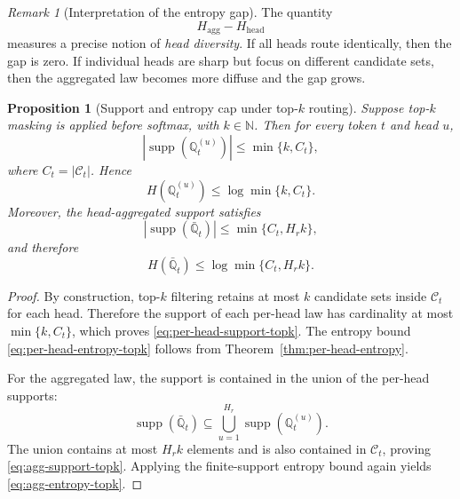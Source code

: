 \documentclass{article}
\theoremstyle{plain}
\newtheorem{proposition}[theorem]{Proposition}
\theoremstyle{definition}
\theoremstyle{remark}
\newtheorem{remark}[theorem]{Remark}
\begin{document}
\begin{remark}[Interpretation of the entropy gap]
\label{rem:entropy-gap-interpretation}
The quantity
\[
H_{\mathrm{agg}}-H_{\mathrm{head}}
\]
measures a precise notion of \emph{head diversity}. If all heads route identically, then the gap is zero. If individual heads are sharp but focus on different candidate sets, then the aggregated law becomes more diffuse and the gap grows.
\end{remark}

\begin{proposition}[Support and entropy cap under top-$k$ routing]
\label{prop:topk-support-entropy}
Suppose top-$k$ masking is applied before softmax, with $k\in \mathbb{N}$. Then for every token $t$ and head $u$,
\begin{equation}
\label{eq:per-head-support-topk}
\left| \operatorname{supp}\!\left(\mathbb{Q}^{(u)}_{t}\right)\right|
\le
\min\{k, C_{t}\},
\end{equation}
where $C_{t}=|\mathcal{C}_{t}|$. Hence
\begin{equation}
\label{eq:per-head-entropy-topk}
H\!\left(\mathbb{Q}^{(u)}_{t}\right)
\le
\log \min\{k,C_{t}\}.
\end{equation}
Moreover, the head-aggregated support satisfies
\begin{equation}
\label{eq:agg-support-topk}
\left| \operatorname{supp}(\bar{\mathbb{Q}}_{t})\right|
\le
\min\{C_{t}, H_r k\},
\end{equation}
and therefore
\begin{equation}
\label{eq:agg-entropy-topk}
H(\bar{\mathbb{Q}}_{t})
\le
\log \min\{C_{t}, H_r k\}.
\end{equation}
\end{proposition}

\begin{proof}
By construction, top-$k$ filtering retains at most $k$ candidate sets inside $\mathcal{C}_{t}$ for each head. Therefore the support of each per-head law has cardinality at most $\min\{k,C_{t}\}$, which proves \eqref{eq:per-head-support-topk}. The entropy bound \eqref{eq:per-head-entropy-topk} follows from Theorem~\ref{thm:per-head-entropy}.

For the aggregated law, the support is contained in the union of the per-head supports:
\[
\operatorname{supp}(\bar{\mathbb{Q}}_{t})
\subseteq
\bigcup_{u=1}^{H_r}
\operatorname{supp}\!\left(\mathbb{Q}^{(u)}_{t}\right).
\]
The union contains at most $H_r k$ elements and is also contained in $\mathcal{C}_{t}$, proving \eqref{eq:agg-support-topk}. Applying the finite-support entropy bound again yields \eqref{eq:agg-entropy-topk}.
\end{proof}
\end{document}
